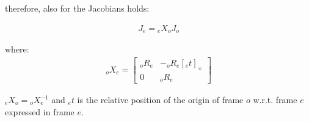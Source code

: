 \documentclass{report}
\newcommand{\mat}[1]{\ensuremath{\begin{bmatrix}#1\end{bmatrix}}}	%
\begin{document}
therefore, also for the Jacobians holds:

\begin{align}
J_{e}  = {}_{e}X_o J_o
\label{fig:}
\end{align}

where: 
\begin{align}
{}_{o}X_e  = \mat{ {}_{o}R_e   &  -{}_o R_e [{}_{e}t]_{\times} \\
					0             &     {}_oR_{e}} 
\label{fig:}
\end{align}

$ {}_{e}X_o =  {}_{o}X_e^{-1}$ and ${}_{e}t$ is the relative position of the origin of frame ${o}$ w.r.t. frame $e$ expressed in frame ${e}$.


 
\end{document}
